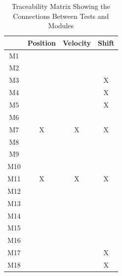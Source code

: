 \documentclass[12pt, titlepage]{article}
\begin{document}
  \begin{table}[h!]
    \centering
    \begin{tabular}{|c|c|c|c|}
    \hline
      & Position & Velocity & Shift \\
    \hline
    M1        & & &  \\ \hline
    M2        & & &  \\ \hline
    M3        & & &X \\ \hline
    M4        & & &X \\ \hline
    M5        & & &X \\ \hline
    M6        & & &  \\ \hline
    M7        &X&X&X \\ \hline
    M8        & & &  \\ \hline
    M9        & & &  \\ \hline
    M10       & & &  \\ \hline
    M11       &X&X&X \\ \hline
    M12       & & &  \\ \hline
    M13       & & &  \\ \hline
    M14       & & &  \\ \hline
    M15       & & &  \\ \hline
    M16       & & &  \\ \hline
    M17       & & &X \\ \hline
    M18       & & &X \\ \hline
    \end{tabular}
    \caption{Traceability Matrix Showing the Connections Between Tests and Modules}
    \label{Table:trace_modules}
    \end{table}
\end{document}
